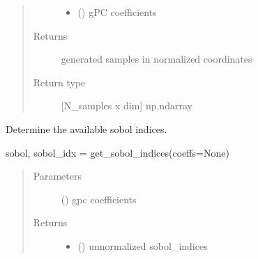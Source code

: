 \documentclass[letterpaper,10pt,english,openany,oneside]{sphinxmanual}
\begin{document}
\begin{fulllineitems}
\begin{fulllineitems}
\begin{quote}
\begin{description}
\begin{itemize}
\item {} 
 (\sphinxstyleliteralemphasis{\sphinxupquote{{[}}}\sphinxstyleliteralemphasis{\sphinxupquote{{]} }}\sphinxstyleliteralemphasis{\sphinxupquote{, }}\sphinxstyleliteralemphasis{\sphinxupquote{, }}) \textendash{} gPC coefficients

\end{itemize}

\item[{Returns}] \leavevmode
{} \textendash{} generated samples in normalized coordinates

\item[{Return type}] \leavevmode
{[}N\_samples x dim{]} np.ndarray

\end{description}\end{quote}

\end{fulllineitems}


\begin{fulllineitems}
\label{\detokenize{pygpc:pygpc.gpc.gPC.get_sobol_indices}}
Determine the available sobol indices.

sobol, sobol\_idx = get\_sobol\_indices(coeffs=None)
\begin{quote}\begin{description}
\item[{Parameters}] \leavevmode
{} (\sphinxstyleliteralemphasis{\sphinxupquote{{[}}}\sphinxstyleliteralemphasis{\sphinxupquote{{]} }}\sphinxstyleliteralemphasis{\sphinxupquote{, }}\sphinxstyleliteralemphasis{\sphinxupquote{, }}) \textendash{} gpc coefficients

\item[{Returns}] \leavevmode
\begin{itemize}
\item {} 
 () \textendash{} unnormalized sobol\_indices


\end{itemize}
\end{description}
\end{quote}
\end{fulllineitems}
\end{fulllineitems}
\end{document}
